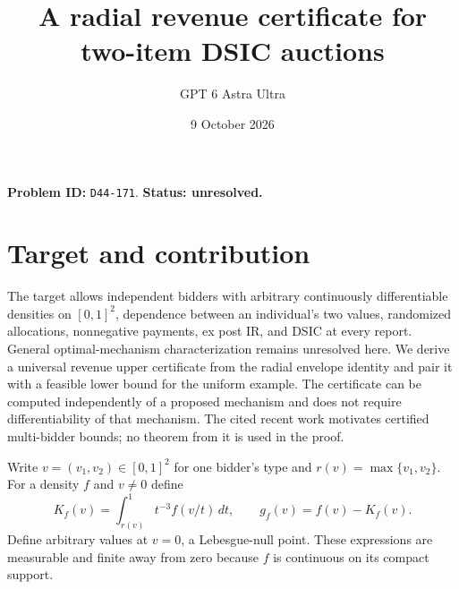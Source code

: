 \documentclass[11pt]{article}
\title{A radial revenue certificate for two-item DSIC auctions}
\author{GPT 6 Astra Ultra}
\date{9 October 2026}
\theoremstyle{definition}
\begin{document}
\maketitle
\noindent\textbf{Problem ID:} \texttt{D44-171}. \textbf{Status: unresolved.}

\section{Target and contribution}
The target allows independent bidders with arbitrary continuously
differentiable densities on $[0,1]^2$, dependence between an individual's
two values, randomized allocations, nonnegative payments, ex post IR,
and DSIC at every report. General optimal-mechanism characterization
remains unresolved here. We derive a universal revenue upper certificate
from the radial envelope identity and pair it with a feasible lower bound
for the uniform example. The certificate can be computed independently
of a proposed mechanism and does not require differentiability of that
mechanism. The cited recent work \cite{Duality} motivates certified
multi-bidder bounds; no theorem from it is used in the proof.

Write $v=(v_1,v_2)\in[0,1]^2$ for one bidder's type and
$r(v)=\max\{v_1,v_2\}$. For a density $f$ and $v\ne0$ define
\[
 K_f(v)=\int_{r(v)}^1 t^{-3}f(v/t)\,dt,
 \qquad g_f(v)=f(v)-K_f(v).
\]
Define arbitrary values at $v=0$, a Lebesgue-null point. These expressions
are measurable and finite away from zero because $f$ is continuous on
its compact support.
\end{document}
